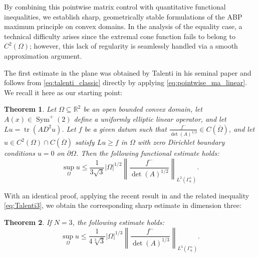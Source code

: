 \documentclass[10pt,a4paper]{amsart}
\newtheorem{theorem}{Theorem}[section]
\numberwithin{equation}{section}
\begin{document}
\noindent By combining this pointwise matrix control with quantitative functional inequalities, we establish sharp, geometrically stable formulations of the ABP maximum principle on convex domains. In the analysis of the equality case, a technical difficulty arises since the extremal cone function fails to belong to $C^2(\Omega)$; however, this lack of regularity is seamlessly handled via a smooth approximation argument.

\noindent The first estimate in the plane was obtained by Talenti in his seminal paper \cite{talenti1981} and follows from \eqref{eq:talenti_classic} directly by applying \eqref{eq:pointwise_ma_linear}. We recall it here as our starting point:

\begin{theorem}
Let $\Omega \subseteq \mathbb{R}^2$ be an open bounded convex domain, let $A(x) \in \operatorname{Sym}^+(2)$ define a uniformly elliptic linear operator, and let $Lu = \operatorname{tr}(A D^2u)$. Let $f$ be a given datum such that $\frac{f^-}{\det(A)^{1/2}} \in C(\overline{\Omega})$, and let $u \in C^2(\Omega) \cap C(\overline{\Omega})$ satisfy $Lu \ge f$ in $\Omega$ with zero Dirichlet boundary conditions $u=0$ on $\partial \Omega$. Then the following functional estimate holds:
\begin{equation}
\sup_\Omega u \le \frac{1}{3\sqrt{3}}|\Omega|^{1/2} \left\| \frac{f^-}{\det(A)^{1/2}} \right\|_{L^2(\Gamma^+_u)}.
\end{equation}
\end{theorem}

\noindent With an identical proof, applying the recent result in \cite{chen2026mahler} and the related inequality \eqref{eq:Talenti3}, we obtain the corresponding sharp estimate in dimension three:

\begin{theorem}
If $N=3$, the following estimate holds:
\begin{equation}
\sup_\Omega u \le \frac{1}{4 \sqrt[3]{3}}|\Omega|^{1/3} \left\| \frac{f^-}{\det(A)^{1/3}} \right\|_{L^3(\Gamma^+_u)}.
\end{equation}
\end{theorem}
\end{document}
